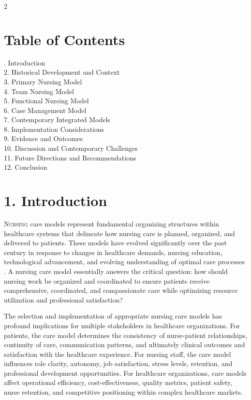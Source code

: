 \documentclass[12pt]{article}
\begin{document}
\begin{multicols}{2}

\section*{Table of Contents}

. Introduction \\
2. Historical Development and Context \\
3. Primary Nursing Model \\
4. Team Nursing Model \\
5. Functional Nursing Model \\
6. Case Management Model \\
7. Contemporary Integrated Models \\
8. Implementation Considerations \\
9. Evidence and Outcomes \\
10. Discussion and Contemporary Challenges \\
11. Future Directions and Recommendations \\
12. Conclusion

\vspace{0.2in}

\section*{1. \quad Introduction}

\lettrine[lines=3]{N}{ursing} care models represent fundamental organizing structures within healthcare systems that delineate how nursing care is planned, organized, and delivered to patients. These models have evolved significantly over the past century in response to changes in healthcare demands, nursing education, technological advancement, and evolving understanding of optimal care processes \citep{nursing2023models}. A nursing care model essentially answers the critical question: how should nursing work be organized and coordinated to ensure patients receive comprehensive, coordinated, and compassionate care while optimizing resource utilization and professional satisfaction?

The selection and implementation of appropriate nursing care models has profound implications for multiple stakeholders in healthcare organizations. For patients, the care model determines the consistency of nurse-patient relationships, continuity of care, communication patterns, and ultimately clinical outcomes and satisfaction with the healthcare experience. For nursing staff, the care model influences role clarity, autonomy, job satisfaction, stress levels, retention, and professional development opportunities. For healthcare organizations, care models affect operational efficiency, cost-effectiveness, quality metrics, patient safety, nurse retention, and competitive positioning within complex healthcare markets.


\end{multicols}
\end{document}
